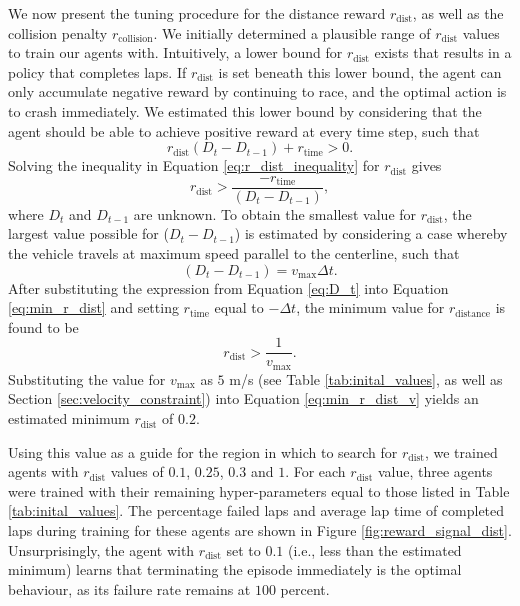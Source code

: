 We now present the tuning procedure for the distance reward $r_{\text{dist}}$, as well as the collision penalty $r_{\text{collision}}$.
We initially determined a plausible range of $r_{\text{dist}}$ values to train our agents with.
Intuitively, a lower bound for $r_{\text{dist}}$ exists that results in a policy that completes laps.
If $r_{\text{dist}}$ is set beneath this lower bound, the agent can only accumulate negative reward by continuing to race, and the optimal action is to crash immediately.
We estimated this lower bound by considering that the agent should be able to achieve positive reward at every time step, such that
\begin{equation}\label{eq:r_dist_inequality}
    r_{\text{dist}}(D_{t} - D_{t-1}) + r_{\text{time}} > 0.
\end{equation}
Solving the inequality in Equation \ref{eq:r_dist_inequality} for $r_{\text{dist}}$ gives
\begin{equation}
    r_{\text{dist}} > \frac{-r_{\text{time}}}{(D_t-D_{t-1})},
\label{eq:min_r_dist}
\end{equation}
where $D_{t}$ and $D_{t-1}$ are unknown.
To obtain the smallest value for $r_{\text{dist}}$, the largest value possible for ($D_{t}-D_{t-1}$) is estimated by considering a case whereby the vehicle  travels at maximum speed parallel to the centerline, such that
\begin{equation}\label{eq:D_t}
    (D_t - D_{t-1}) = v_{\text{max}} \Delta t.
\end{equation}
After substituting the expression from Equation \ref{eq:D_t} into Equation \ref{eq:min_r_dist} and setting $r_{\text{time}}$ equal to $-\Delta t$, 
the minimum value for $r_{\text{distance}}$ is found to be
\begin{equation}\label{eq:min_r_dist_v}
    r_{\text{dist}} > \frac{1}{v_{\text{max}}}.
\end{equation}
Substituting the value for $v_{\text{max}}$ as $5$ m/s (see Table \ref{tab:inital_values}, as well as Section \ref{sec:velocity_constraint}) into Equation \ref{eq:min_r_dist_v} yields an estimated minimum $r_{\text{dist}}$ of $0.2$.


Using this value as a guide for the region in which to search for  $r_{\text{dist}}$, we trained agents with $r_{\text{dist}}$ values of $0.1$, $0.25$, $0.3$ and $1$. 
For each $r_{\text{dist}}$ value, three agents were trained with their remaining hyper-parameters equal to those listed in Table \ref{tab:inital_values}.
The percentage failed laps and average lap time of completed laps during training for these agents are shown in Figure \ref{fig:reward_signal_dist}.
Unsurprisingly, the agent with $r_{\text{dist}}$ set to $0.1$ (i.e., less than the estimated minimum) learns that terminating the episode immediately is the optimal behaviour, as its failure rate remains at $100$ percent.

